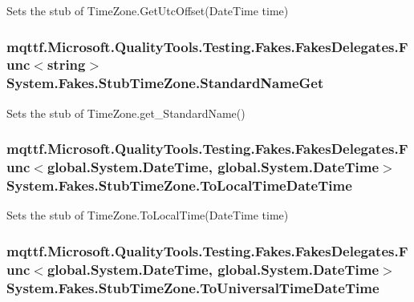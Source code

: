 Sets the stub of Time\-Zone.\-Get\-Utc\-Offset(\-Date\-Time time)

\hypertarget{class_system_1_1_fakes_1_1_stub_time_zone_a0a0443d1968d38e593f0c32cb617c09b}{
\subsubsection[{Standard\-Name\-Get}]{\setlength{\rightskip}{0pt plus 5cm}mqttf.\-Microsoft.\-Quality\-Tools.\-Testing.\-Fakes.\-Fakes\-Delegates.\-Func$<$string$>$ System.\-Fakes.\-Stub\-Time\-Zone.\-Standard\-Name\-Get}}\label{class_system_1_1_fakes_1_1_stub_time_zone_a0a0443d1968d38e593f0c32cb617c09b}


Sets the stub of Time\-Zone.\-get\-\_\-\-Standard\-Name()

\hypertarget{class_system_1_1_fakes_1_1_stub_time_zone_ae122a654e6fb6a027093be7dd9382ec7}{
\subsubsection[{To\-Local\-Time\-Date\-Time}]{\setlength{\rightskip}{0pt plus 5cm}mqttf.\-Microsoft.\-Quality\-Tools.\-Testing.\-Fakes.\-Fakes\-Delegates.\-Func$<$global.\-System.\-Date\-Time, global.\-System.\-Date\-Time$>$ System.\-Fakes.\-Stub\-Time\-Zone.\-To\-Local\-Time\-Date\-Time}}\label{class_system_1_1_fakes_1_1_stub_time_zone_ae122a654e6fb6a027093be7dd9382ec7}


Sets the stub of Time\-Zone.\-To\-Local\-Time(\-Date\-Time time)

\hypertarget{class_system_1_1_fakes_1_1_stub_time_zone_aba36963724489788469b76405c9b6f49}{
\subsubsection[{To\-Universal\-Time\-Date\-Time}]{\setlength{\rightskip}{0pt plus 5cm}mqttf.\-Microsoft.\-Quality\-Tools.\-Testing.\-Fakes.\-Fakes\-Delegates.\-Func$<$global.\-System.\-Date\-Time, global.\-System.\-Date\-Time$>$ System.\-Fakes.\-Stub\-Time\-Zone.\-To\-Universal\-Time\-Date\-Time}}\label{class_system_1_1_fakes_1_1_stub_time_zone_aba36963724489788469b76405c9b6f49}


